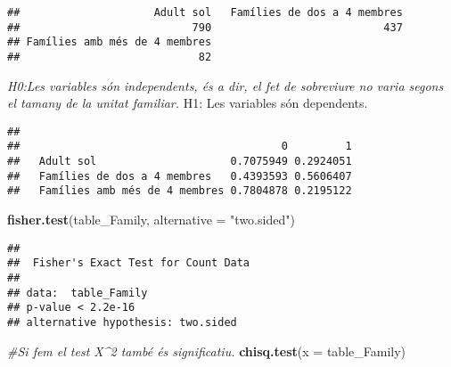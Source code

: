 \documentclass[]{article}
\newenvironment{Shaded}{\begin{snugshade}}{\end{snugshade}}
\newcommand{\CommentTok}[1]{\textcolor[rgb]{0.56,0.35,0.01}{\textit{#1}}}
\newcommand{\DataTypeTok}[1]{\textcolor[rgb]{0.13,0.29,0.53}{#1}}
\newcommand{\DecValTok}[1]{\textcolor[rgb]{0.00,0.00,0.81}{#1}}
\newcommand{\KeywordTok}[1]{\textcolor[rgb]{0.13,0.29,0.53}{\textbf{#1}}}
\newcommand{\NormalTok}[1]{#1}
\newcommand{\OperatorTok}[1]{\textcolor[rgb]{0.81,0.36,0.00}{\textbf{#1}}}
\newcommand{\StringTok}[1]{\textcolor[rgb]{0.31,0.60,0.02}{#1}}
\begin{document}
\begin{verbatim}
##                     Adult sol   Famílies de dos a 4 membres 
##                           790                           437 
## Famílies amb més de 4 membres 
##                            82
\end{verbatim}

\emph{H0:Les variables són independents, és a dir, el fet de sobreviure
no varia segons el tamany de la unitat familiar. }H1: Les variables són
dependents.

\begin{Shaded}
\end{Shaded}

\begin{verbatim}
##                                
##                                         0         1
##   Adult sol                     0.7075949 0.2924051
##   Famílies de dos a 4 membres   0.4393593 0.5606407
##   Famílies amb més de 4 membres 0.7804878 0.2195122
\end{verbatim}

\begin{Shaded}
\begin{Highlighting}[]
\KeywordTok{fisher.test}\NormalTok{(table_Family, }\DataTypeTok{alternative =} \StringTok{"two.sided"}\NormalTok{)}
\end{Highlighting}
\end{Shaded}

\begin{verbatim}
## 
##  Fisher's Exact Test for Count Data
## 
## data:  table_Family
## p-value < 2.2e-16
## alternative hypothesis: two.sided
\end{verbatim}

\begin{Shaded}
\begin{Highlighting}[]
\CommentTok{#Si fem el test X^2 també és significatiu.}
\KeywordTok{chisq.test}\NormalTok{(}\DataTypeTok{x =}\NormalTok{ table_Family)}
\end{Highlighting}
\end{Shaded}
\end{document}
